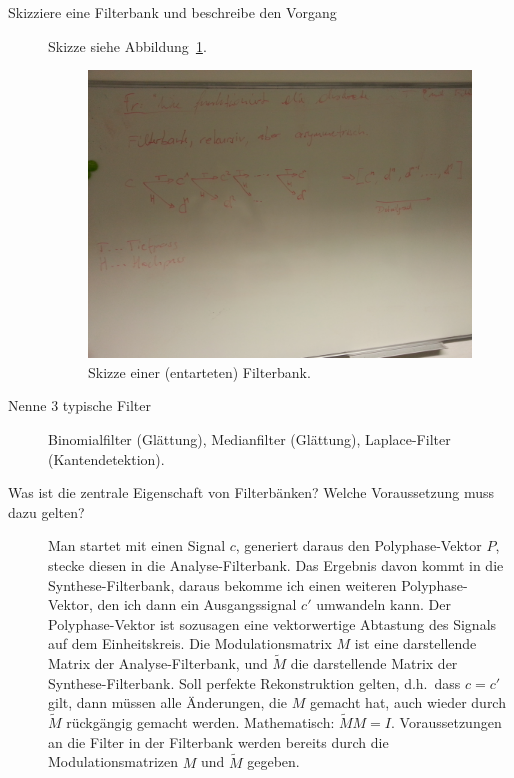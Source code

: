 \begin{description}
	\item[Skizziere eine Filterbank und beschreibe den Vorgang]
	Skizze siehe Abbildung~\ref{fig:Filterbank1}.
    \begin{figure}[ht]
    \centering
    \includegraphics[width=\linewidth]{Fotos/Filterbank1}
    \caption{Skizze einer (entarteten) Filterbank.}
    \label{fig:Filterbank1}
    \end{figure}
	\item[Nenne 3 typische Filter]
  	Binomialfilter (Glättung), Medianfilter (Glättung), Laplace-Filter (Kantendetektion).
	\item[Was ist die zentrale Eigenschaft von Filterbänken? Welche Voraussetzung muss dazu gelten?]
  	Man startet mit einen Signal $ c $, generiert daraus den Polyphase-Vektor $ P $, stecke diesen 
  	in die Analyse-Filterbank. Das Ergebnis davon kommt in die Synthese-Filterbank, daraus bekomme 
  	ich einen weiteren Polyphase-Vektor, den ich dann ein Ausgangssignal $ c' $ umwandeln kann.
  	Der Polyphase-Vektor ist sozusagen eine vektorwertige Abtastung des Signals auf dem 
  	Einheitskreis. Die Modulationsmatrix $ M $ ist eine darstellende Matrix der 
  	Analyse-Filterbank, und $ \widetilde{M} $ die darstellende Matrix der Synthese-Filterbank.
  	Soll perfekte Rekonstruktion gelten, d.h.\ dass $ c = c' $ gilt, dann müssen alle Änderungen, 
  	die $ M $ gemacht hat, auch wieder durch $ \widetilde{M} $ rückgängig gemacht werden. 
  	Mathematisch: $\widetilde{M}M = I $. Voraussetzungen an die Filter in der Filterbank werden 
  	bereits durch die Modulationsmatrizen $ M $ und $ \widetilde{M} $ gegeben.
  	

\end{description}
